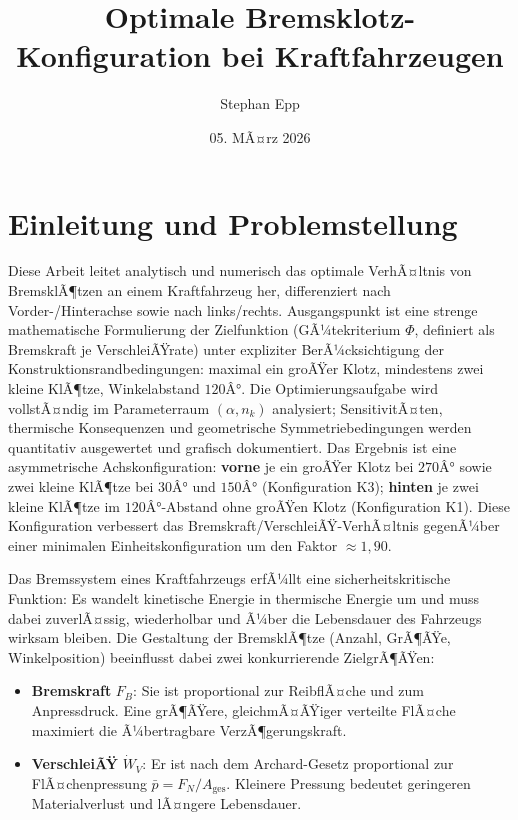 ﻿\documentclass[12pt,a4paper]{article}
\title{\textbf{Optimale Bremsklotz-Konfiguration bei Kraftfahrzeugen}}
\author{Stephan Epp}
\date{05. MÃ¤rz 2026}
\theoremstyle{definition}
\begin{document}
\maketitle

\tableofcontents
\newpage

\section{Einleitung und Problemstellung}
Diese Arbeit leitet analytisch und numerisch das optimale VerhÃ¤ltnis von
BremsklÃ¶tzen an einem Kraftfahrzeug her, differenziert nach Vorder-/Hinterachse
sowie nach links/rechts.  Ausgangspunkt ist eine strenge mathematische Formulierung
der Zielfunktion (GÃ¼tekriterium $\Phi$, definiert als Bremskraft je
VerschleiÃŸrate) unter expliziter BerÃ¼cksichtigung der Konstruktionsrandbedingungen:
maximal ein groÃŸer Klotz, mindestens zwei kleine KlÃ¶tze, Winkelabstand $120Â°$.
Die Optimierungsaufgabe wird vollstÃ¤ndig im Parameterraum $(\alpha, n_k)$
analysiert; SensitivitÃ¤ten, thermische Konsequenzen und geometrische
Symmetriebedingungen werden quantitativ ausgewertet und grafisch dokumentiert.
Das Ergebnis ist eine asymmetrische Achskonfiguration: \textbf{vorne} je
ein groÃŸer Klotz bei $270Â°$ sowie zwei kleine KlÃ¶tze bei $30Â°$ und $150Â°$
(Konfiguration K3); \textbf{hinten} je zwei kleine KlÃ¶tze im $120Â°$-Abstand
ohne groÃŸen Klotz (Konfiguration K1).  Diese Konfiguration verbessert das
Bremskraft/VerschleiÃŸ-VerhÃ¤ltnis gegenÃ¼ber einer minimalen Einheitskonfiguration
um den Faktor $\approx 1{,}90$.

Das Bremssystem eines Kraftfahrzeugs erfÃ¼llt eine sicherheitskritische Funktion:
Es wandelt kinetische Energie in thermische Energie um und muss dabei zuverlÃ¤ssig,
wiederholbar und Ã¼ber die Lebensdauer des Fahrzeugs wirksam bleiben.  Die
Gestaltung der BremsklÃ¶tze (Anzahl, GrÃ¶ÃŸe, Winkelposition) beeinflusst dabei zwei
konkurrierende ZielgrÃ¶ÃŸen:

\begin{itemize}[leftmargin=1.5em, itemsep=2pt]
  \item \textbf{Bremskraft} $F_B$: Sie ist proportional zur ReibflÃ¤che und zum
        Anpressdruck. Eine grÃ¶ÃŸere, gleichmÃ¤ÃŸiger verteilte FlÃ¤che maximiert
        die Ã¼bertragbare VerzÃ¶gerungskraft.
  \item \textbf{VerschleiÃŸ} $\dot{W}_V$: Er ist nach dem Archard-Gesetz
        proportional zur FlÃ¤chenpressung $\bar{p} = F_N / A_{\text{ges}}$.
        Kleinere Pressung bedeutet geringeren Materialverlust und lÃ¤ngere
        Lebensdauer.
\end{itemize}
\end{document}
